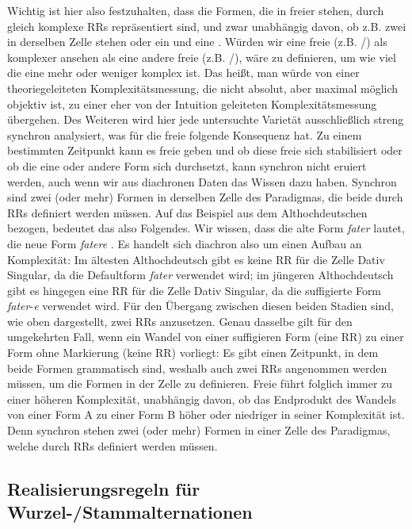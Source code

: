 Wichtig ist hier also festzuhalten, dass die Formen, die in freier  stehen, durch gleich komplexe RRs repräsentiert sind, und zwar unabhängig davon, ob z.B. zwei  in derselben Zelle stehen oder ein  und eine . Würden wir eine freie  (z.B. /) als komplexer ansehen als eine andere freie  (z.B. /), wäre zu definieren, um wie viel die eine mehr oder weniger komplex ist. Das heißt, man würde von einer theoriegeleiteten Komplexitätsmessung, die nicht absolut, aber maximal möglich objektiv ist, zu einer eher von der Intuition geleiteten Komplexitätsmessung übergehen. Des Weiteren wird hier jede untersuchte Varietät ausschließlich streng synchron analysiert, was für die freie  folgende Konsequenz hat. Zu einem bestimmten Zeitpunkt kann es freie  geben und ob diese freie  sich stabilisiert oder ob die eine oder andere Form sich durchsetzt, kann synchron nicht eruiert werden, auch wenn wir aus diachronen Daten das Wissen dazu haben. Synchron sind zwei (oder mehr) Formen in derselben Zelle des Paradigmas, die beide durch RRs definiert werden müssen. Auf das Beispiel aus dem Althochdeutschen bezogen, bedeutet das also Folgendes. Wir wissen, dass die alte Form \textit{fater} lautet, die neue Form \textit{fatere} \citep[214]{Braune2004}. Es handelt sich diachron also um einen Aufbau an Komplexität: Im ältesten Althochdeutsch gibt es keine RR für die Zelle Dativ Singular, da die Defaultform \textit{fater} verwendet wird; im jüngeren Althochdeutsch gibt es hingegen eine RR für die Zelle Dativ Singular, da die suffigierte Form \textit{fater}-\textit{e} verwendet wird. Für den Übergang zwischen diesen beiden Stadien sind, wie oben dargestellt, zwei RRs anzusetzen. Genau dasselbe gilt für den umgekehrten Fall, wenn ein Wandel von einer suffigieren Form (eine RR) zu einer Form ohne Markierung (keine RR) vorliegt: Es gibt einen Zeitpunkt, in dem beide Formen grammatisch sind, weshalb auch zwei RRs angenommen werden müssen, um die Formen in der Zelle zu definieren. Freie  führt folglich immer zu einer höheren Komplexität, unabhängig davon, ob das Endprodukt des Wandels von einer Form A zu einer Form B höher oder niedriger in seiner Komplexität ist. Denn synchron stehen zwei (oder mehr) Formen in einer Zelle des Paradigmas, welche durch RRs definiert werden müssen.

\subsection{Realisierungsregeln für Wurzel-/Stammalternationen}\label{5.1.3}


